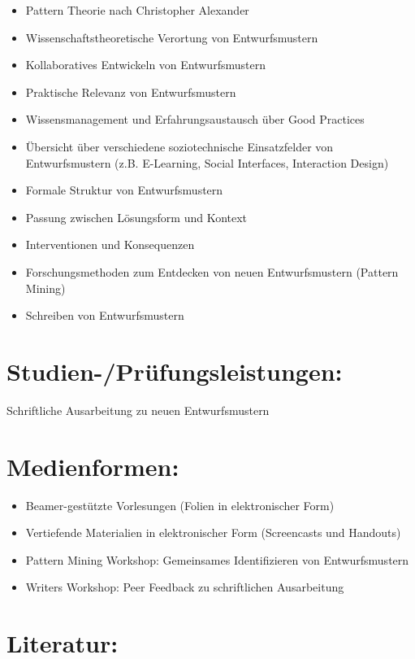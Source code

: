 \begin{itemize}
\item
  Pattern Theorie nach Christopher Alexander
\item
  Wissenschaftstheoretische Verortung von Entwurfsmustern
\item
  Kollaboratives Entwickeln von Entwurfsmustern
\item
  Praktische Relevanz von Entwurfsmustern
\item
  Wissensmanagement und Erfahrungsaustausch über Good Practices
\item
  Übersicht über verschiedene soziotechnische Einsatzfelder von
  Entwurfsmustern (z.B. E-Learning, Social Interfaces, Interaction
  Design)
\item
  Formale Struktur von Entwurfsmustern
\item
  Passung zwischen Lösungsform und Kontext
\item
  Interventionen und Konsequenzen
\item
  Forschungsmethoden zum Entdecken von neuen Entwurfsmustern (Pattern
  Mining)
\item
  Schreiben von Entwurfsmustern
\end{itemize}

\section*{Studien-/Prüfungsleistungen:}\label{studien-pruxfcfungsleistungen-12}

Schriftliche Ausarbeitung zu neuen Entwurfsmustern

\section*{Medienformen:}\label{medienformen-12}

\begin{itemize}
\item
  Beamer-gestützte Vorlesungen (Folien in elektronischer Form)
\item
  Vertiefende Materialien in elektronischer Form (Screencasts und
  Handouts)
\item
  Pattern Mining Workshop: Gemeinsames Identifizieren von
  Entwurfsmustern
\item
  Writers Workshop: Peer Feedback zu schriftlichen Ausarbeitung
\end{itemize}

\section*{Literatur:}\label{literatur-9}

